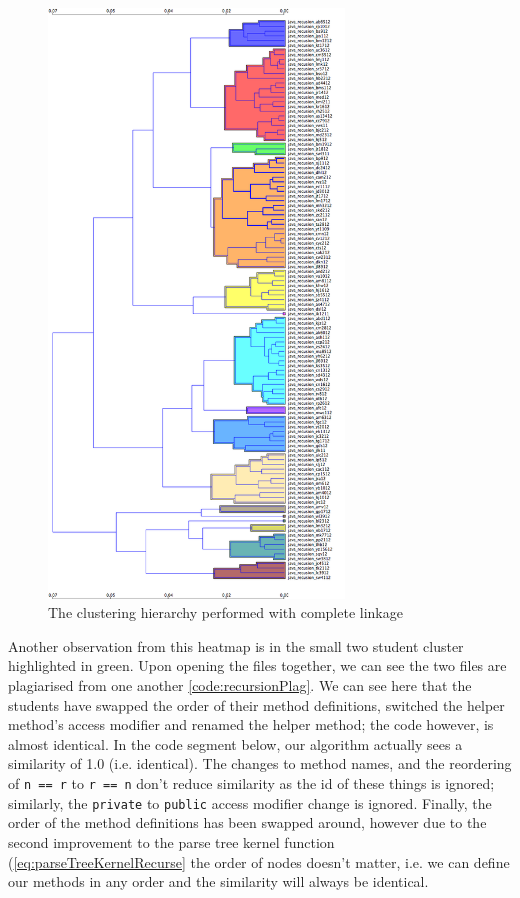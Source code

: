 \begin{figure}[p]

	\centering
		\includegraphics[width=0.7\textwidth]{Figures/RecursionClustering}
	\caption{The clustering hierarchy performed with complete linkage}
	\label{fig:recursionHierarchy}

\end{figure}


Another observation from this heatmap is in the small two student cluster highlighted
in green. Upon opening the files together, we can see the two files are
plagiarised from one another \cref{code:recursionPlag}. We can see here that the
students have swapped the order of their method definitions, switched the
helper method's access modifier and renamed the helper method; the code however,
is almost identical. In the code segment below, our algorithm actually sees a
similarity of 1.0 (i.e. identical). The changes to method names, and the
reordering of \texttt{n == r} to \texttt{r == n} don't reduce similarity
as the id of these things is ignored; similarly, the \texttt{private} to 
\texttt{public} access modifier change is ignored. Finally, the order of the
method definitions has been swapped around, however due to the second improvement
to the parse tree kernel function (\cref{eq:parseTreeKernelRecurse}
the order of nodes doesn't matter, i.e. we can define our methods in any order
and the similarity will always be identical.

